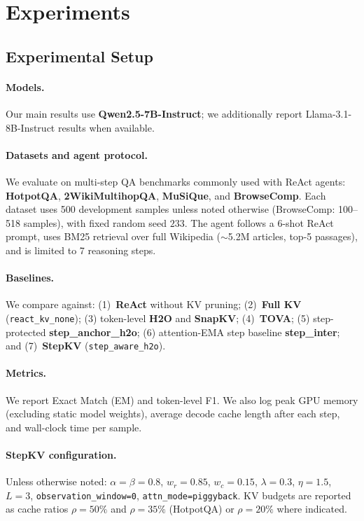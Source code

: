 \documentclass[11pt]{article}
\begin{document}
\section{Experiments}

\subsection{Experimental Setup}

\paragraph{Models.}
Our main results use \textbf{Qwen2.5-7B-Instruct}; we additionally report Llama-3.1-8B-Instruct results when available.

\paragraph{Datasets and agent protocol.}
We evaluate on multi-step QA benchmarks commonly used with ReAct agents:
\textbf{HotpotQA}, \textbf{2WikiMultihopQA}, \textbf{MuSiQue}, and \textbf{BrowseComp}.
Each dataset uses 500 development samples unless noted otherwise (BrowseComp: 100--518 samples), with fixed random seed $233$.
The agent follows a 6-shot ReAct prompt, uses BM25 retrieval over full Wikipedia ($\sim$5.2M articles, top-5 passages), and is limited to 7 reasoning steps.

\paragraph{Baselines.}
We compare against:
(1)~\textbf{ReAct} without KV pruning;
(2)~\textbf{Full KV} (\texttt{react\_kv\_none});
(3) token-level \textbf{H2O} and \textbf{SnapKV};
(4)~\textbf{TOVA};
(5) step-protected \textbf{step\_anchor\_h2o};
(6) attention-EMA step baseline \textbf{step\_inter};
and (7)~\textbf{StepKV} (\texttt{step\_aware\_h2o}).

\paragraph{Metrics.}
We report Exact Match (EM) and token-level F1.
We also log peak GPU memory (excluding static model weights), average decode cache length after each step, and wall-clock time per sample.

\paragraph{StepKV configuration.}
Unless otherwise noted: $\alpha=\beta=0.8$, $w_r=0.85$, $w_c=0.15$, $\lambda=0.3$, $\eta=1.5$, $L=3$, \texttt{observation\_window=0}, \texttt{attn\_mode=piggyback}.
KV budgets are reported as cache ratios $\rho=50\%$ and $\rho=35\%$ (HotpotQA) or $\rho=20\%$ where indicated.
\end{document}
